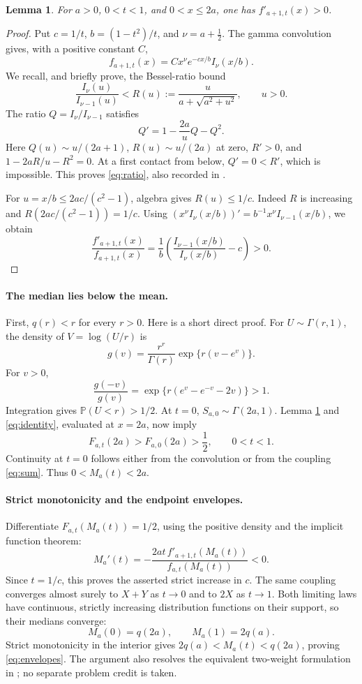 \documentclass[11pt]{article}
\newtheorem{lemma}{Lemma}
\newcommand{\Prob}{\mathbb P}
\begin{document}
\begin{lemma}\label{lem:increasing}
For \(a>0\), \(0<t<1\), and \(0<x\leq2a\), one has
\(f'_{a+1,t}(x)>0\).
\end{lemma}
\begin{proof}
Put \(c=1/t\), \(b=(1-t^2)/t\), and \(\nu=a+\tfrac12\).
The gamma convolution gives, with a positive constant \(C\),
\[
 f_{a+1,t}(x)=C x^\nu e^{-cx/b}I_\nu(x/b).
\]
We recall, and briefly prove, the Bessel-ratio bound
\begin{equation}\label{eq:ratio}
 \frac{I_\nu(u)}{I_{\nu-1}(u)}
 < R(u):=\frac{u}{a+\sqrt{a^2+u^2}},\qquad u>0 .
\end{equation}
The ratio \(Q=I_\nu/I_{\nu-1}\) satisfies
\[
 Q'=1-\frac{2a}{u}Q-Q^2.
\]
Here \(Q(u)\sim u/(2a+1)\), \(R(u)\sim u/(2a)\) at zero,
\(R'>0\), and \(1-2aR/u-R^2=0\).
At a first contact from below, \(Q'=0<R'\), which is impossible.
This proves \eqref{eq:ratio}, also recorded in \cite[eq.\ (2.10)]{GM}.

For \(u=x/b\leq2ac/(c^2-1)\), algebra gives
\(R(u)\leq1/c\). Indeed \(R\) is increasing and
\(R(2ac/(c^2-1))=1/c\).
Using \((x^\nu I_\nu(x/b))'=b^{-1}x^\nu I_{\nu-1}(x/b)\),
we obtain
\[
 \frac{f'_{a+1,t}(x)}{f_{a+1,t}(x)}
 =\frac1b\left(\frac{I_{\nu-1}(x/b)}{I_\nu(x/b)}-c\right)>0.
\]
\end{proof}

\paragraph{The median lies below the mean.}
First, \(q(r)<r\) for every \(r>0\). Here is a short direct proof.
For \(U\sim\Gamma(r,1)\), the density of \(V=\log(U/r)\) is
\[
 g(v)=\frac{r^r}{\Gamma(r)}\exp\{r(v-e^v)\}.
\]
For \(v>0\),
\[
 \frac{g(-v)}{g(v)}
 =\exp\{r(e^v-e^{-v}-2v)\}>1.
\]
Integration gives \(\Prob(U<r)>1/2\).
At \(t=0\), \(S_{a,0}\sim\Gamma(2a,1)\). Lemma
\ref{lem:increasing} and \eqref{eq:identity}, evaluated at \(x=2a\),
now imply
\[
 F_{a,t}(2a)>F_{a,0}(2a)>\frac12,\qquad 0<t<1.
\]
Continuity at \(t=0\) follows either from the convolution or from the
coupling \eqref{eq:sum}. Thus \(0<M_a(t)<2a\).

\paragraph{Strict monotonicity and the endpoint envelopes.}
Differentiate \(F_{a,t}(M_a(t))=1/2\), using the positive density
and the implicit function theorem:
\begin{equation}\label{eq:median}
 M_a'(t)
 =-\frac{2at\,f'_{a+1,t}(M_a(t))}{f_{a,t}(M_a(t))}<0.
\end{equation}
Since \(t=1/c\), this proves the asserted strict increase in \(c\).
The same coupling converges almost surely to \(X+Y\) as \(t\to0\)
and to \(2X\) as \(t\to1\). Both limiting laws have continuous,
strictly increasing distribution functions on their support, so their
medians converge:
\[
 M_a(0)=q(2a),\qquad M_a(1)=2q(a).
\]
Strict monotonicity in the interior gives
\(2q(a)<M_a(t)<q(2a)\), proving \eqref{eq:envelopes}.
The argument also resolves the equivalent two-weight formulation
in \cite[Conjecture 3.2]{GM}; no separate problem credit is taken.
\end{document}
